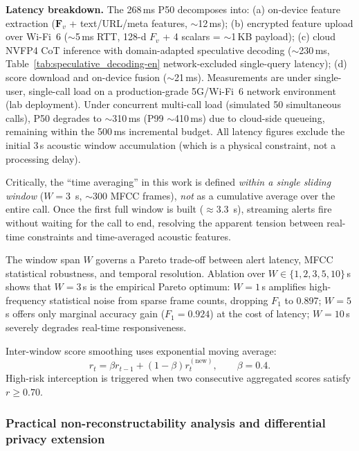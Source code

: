 \documentclass[11pt, a4paper]{article}
\begin{document}
\medskip
\noindent\textbf{Latency breakdown.} The 268\,ms P50 decomposes into: (a) on-device feature extraction ($\bm{F}_v$ + text/URL/meta features, $\sim$12\,ms); (b) encrypted feature upload over Wi-Fi~6 ($\sim$5\,ms RTT, 128-d $F_v$ + 4 scalars = $\sim$1\,KB payload); (c) cloud NVFP4 CoT inference with domain-adapted speculative decoding ($\sim$230\,ms, Table~\ref{tab:speculative_decoding-en} network-excluded single-query latency); (d) score download and on-device fusion ($\sim$21\,ms). Measurements are under single-user, single-call load on a production-grade 5G/Wi-Fi~6 network environment (lab deployment). Under concurrent multi-call load (simulated 50 simultaneous calls), P50 degrades to $\sim$310\,ms (P99 $\sim$410\,ms) due to cloud-side queueing, remaining within the 500\,ms incremental budget. All latency figures exclude the initial 3\,s acoustic window accumulation (which is a physical constraint, not a processing delay).

\medskip
\noindent Critically, the ``time averaging'' in this work is defined \emph{within a single sliding window} ($W=3$~s, $\sim$300 MFCC frames), \emph{not} as a cumulative average over the entire call. Once the first full window is built ($\approx 3.3$~s), streaming alerts fire without waiting for the call to end, resolving the apparent tension between real-time constraints and time-averaged acoustic features.

The window span $W$ governs a Pareto trade-off between alert latency, MFCC statistical robustness, and temporal resolution. Ablation over $W\in\{1,2,3,5,10\}$\,s shows that $W = 3$\,s is the empirical Pareto optimum: $W = 1$\,s amplifies high-frequency statistical noise from sparse frame counts, dropping $F_1$ to 0.897; $W = 5$\,s offers only marginal accuracy gain ($F_1 = 0.924$) at the cost of latency; $W = 10$\,s severely degrades real-time responsiveness.

Inter-window score smoothing uses exponential moving average:
\begin{equation}
r_t = \beta r_{t-1} + (1-\beta)r_t^{(\mathrm{new})}, \qquad \beta = 0.4.
\end{equation}
High-risk interception is triggered when two consecutive aggregated scores satisfy $r\ge 0.70$.

\subsubsection{Practical non-reconstructability analysis and differential privacy extension}
\end{document}
